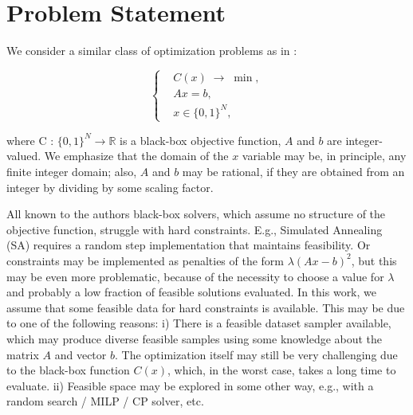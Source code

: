 \documentclass{article}
\theoremstyle{plain}
\theoremstyle{definition}
\theoremstyle{remark}
\begin{document}
\section{Problem Statement}
We consider a similar class of optimization problems as in \cite{LopezPiqueres2023}: 

\begin{equation}
\left\{
\begin{aligned}
    & C(x) \;\to\; \min, \\[4pt]
    & A x = b, \\[4pt]
    & x \in \{0,1\}^N ,
\end{aligned}
\right.
\label{eq:problem_statement}
\end{equation}

where C : $\{0,1\}^N \to \mathbb{R} $ is a black-box objective function, $A$ and $b$ are integer-valued. We emphasize that the domain of the $x$ variable may be, in principle, any finite integer domain; also, $A$ and $b$ may be rational, if they are obtained from an integer by dividing by some scaling factor.

All known to the authors black-box solvers, which assume no structure of the objective function, struggle with hard constraints. E.g., Simulated Annealing (SA) \cite{kirkpatrick1983optimization} requires a random step implementation that maintains feasibility. Or constraints may be implemented as penalties of the form $\lambda \left(Ax - b\right)^2$, but this may be even more problematic, because of the necessity to choose a value for $\lambda$ and probably a low fraction of feasible solutions evaluated. In this work, we assume that some feasible data for hard constraints is available. This may be due to one of the following reasons: i) There is a feasible dataset sampler available, which may produce diverse feasible samples using some knowledge about the matrix $A$ and vector $b$. The optimization itself may still be very challenging due to the black-box function $C(x)$, which, in the worst case, takes a long time to evaluate. ii) Feasible space may be explored in some other way, e.g., with a random search / MILP / CP solver, etc.
\end{document}
